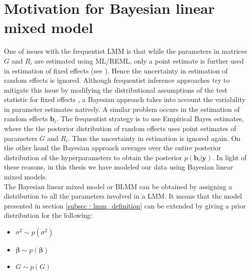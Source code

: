 \section{Motivation for Bayesian linear mixed model}
\label{sec : blmm}
One of issues with the frequentist LMM is that while the parameters in matrices $G$ and $R_i$ are estimated using ML/REML, only a point estimate is further used in estimation of fixed effects (see \cite[chap. 5]{verbeke_linear_2009}). Hence the uncertainty in estimation of random effects is ignored. Although frequentist inference approaches try to mitigate this issue by modifying the distributional assumptions of the test statistic for fixed effects \citep[pg. 56]{verbeke_linear_2009}, a Bayesian approach takes into account the variability in parameter estimates natively. A similar problem occurs in the estimation of random effects $\boldsymbol{b}_i$. The frequentist strategy is to use Empirical Bayes estimates, where the the posterior distribution of random effects uses point estimates of parameters $G$ and $R_i$. Thus the uncertainty in estimation is ignored again. On the other hand the Bayesian approach averages over the entire posterior distribution of the hyperparameters to obtain the posterior $p(\boldsymbol{b}_i|\boldsymbol{y})$. In light of these reasons, in this thesis we have modeled our data using Bayesian linear mixed models.\\

The Bayesian linear mixed model or BLMM can be obtained by assigning a distribution to all the parameters involved in a LMM. It means that the model presented in section \ref{subsec : lmm_definition} can be extended by giving a prior distribution for the following:
\begin{itemize}
\item $\sigma^2 \sim p(\sigma^2)$
\item $\boldsymbol{\beta} \sim p(\boldsymbol{\beta})$
\item $G \sim p(G)$
\end{itemize}

